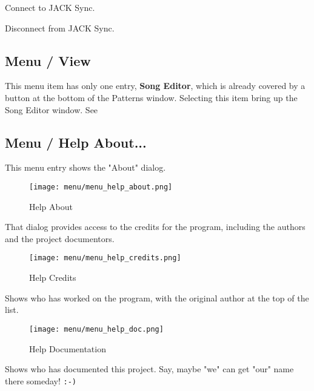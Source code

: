    Connect to JACK Sync.

   Disconnect from JACK Sync.

\subsection{Menu / View}
\label{subsec:seq24_menu_view}

   This menu item has only one entry, \textbf{Song Editor}, 
   which is already covered by a button at the bottom of the Patterns
   window.  Selecting this item bring up the Song Editor window.
   See 

\subsection{Menu / Help About...}
\label{subsec:seq24_menu_about}

   This menu entry shows the "About" dialog.

\begin{figure}[H]
   \centering 
   \texttt{[image: menu/menu\_help\_about.png]}
   \caption{Help About}
   \label{fig:seq24_menu_help_about}
\end{figure}

   That dialog provides access to the credits for the program, including the
   authors and the project documentors.

\begin{figure}[H]
   \centering 
   \texttt{[image: menu/menu\_help\_credits.png]}
   \caption{Help Credits}
   \label{fig:seq24_menu_help_credits}
\end{figure}

   Shows who has worked on the program, with the original author at the top
   of the list.

\begin{figure}[H]
   \centering 
   \texttt{[image: menu/menu\_help\_doc.png]}
   \caption{Help Documentation}
   \label{fig:seq24_menu_help_doc}
\end{figure}

   Shows who has documented this project.  Say, maybe "we" can get "our"
   name there someday!  \texttt{:-)}

